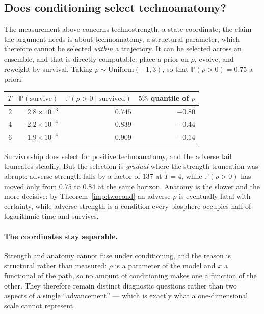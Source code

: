 \documentclass[11pt]{article}
\newcommand{\PP}{\mathbb{P}}
\theoremstyle{plain}
\theoremstyle{definition}
\theoremstyle{remark}
\begin{document}
\subsection{Does conditioning select technoanatomy?}
\label{gr:subsub:anatsel}

The measurement above concerns technostrength, a state coordinate; the
claim the argument needs is about technoanatomy, a structural parameter,
which therefore cannot be selected \emph{within} a trajectory. It can be
selected across an ensemble, and that is directly computable: place a
prior on $\rho$, evolve, and reweight by survival. Taking
$\rho\sim\mathrm{Uniform}(-1,3)$, so that $\PP(\rho>0)=0.75$ a priori:

\begin{center}\small
\begin{tabular}{@{}rrrr@{}}
\toprule
$T$ & $\PP(\text{survive})$ & $\PP(\rho>0\mid\text{survived})$ &
$5\%$ quantile of $\rho$\\
\midrule
$2$ & $2.8\times10^{-3}$ & $0.745$ & $-0.80$\\
$4$ & $2.2\times10^{-4}$ & $0.839$ & $-0.44$\\
$6$ & $1.9\times10^{-4}$ & $0.909$ & $-0.14$\\
\bottomrule
\end{tabular}
\end{center}

\noindent Survivorship does select for positive technoanatomy, and the
adverse tail truncates steadily. But the selection is \emph{gradual}
where the strength truncation was abrupt: adverse strength falls by a
factor of $137$ at $T=4$, while $\PP(\rho>0)$ has moved only from
$0.75$ to $0.84$ at the same horizon. Anatomy is the slower and the more
decisive: by Theorem~\ref{imp:twocond} an adverse $\rho$ is
eventually fatal with certainty, while adverse strength is a condition
every biosphere occupies half of logarithmic time and survives.

\paragraph{The coordinates stay separable.}\label{gr:rem:separable}
Strength and anatomy cannot fuse under conditioning, and the reason is
structural rather than measured: $\rho$ is a parameter of the model and
$x$ a functional of the path, so no amount of conditioning makes one a
function of the other. They therefore remain distinct diagnostic
questions rather than two aspects of a single ``advancement'' --- which
is exactly what a one-dimensional scale cannot represent.
\end{document}
